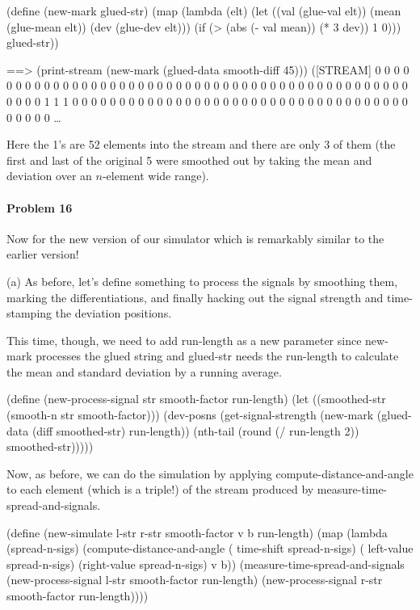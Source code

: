 \mbox{} %

\beginlisp
(define (new-mark glued-str)
  (map (lambda (elt)
         (let ((val  (glue-val  elt))
               (mean (glue-mean elt))
               (dev  (glue-dev  elt)))
           (if (> (abs (- val mean)) (* 3 dev))
               1
               0)))
       glued-str))
\endlisp

\beginlisp
==> (print-stream (new-mark (glued-data smooth-diff 45)))
([STREAM] 0 0 0 0 0 0 0 0 0 0 0 0 0 0 0 0 0 0 0 0 0 0 0 0 0 0 0 0 0 0 0 0 0
          0 0 0 0 0 0 0 0 0 0 0 0 0 0 0 0 0 0 1 1 1 0 0 0 0 0 0 0 0 0 0 0 0
          0 0 0 0 0 0 0 0 0 0 0 0 0 0 0 0 0 0 0 0 0 0 0 0 0 0 0 0 0 \ldots
\endlisp

Here the 1's are 52 elements into the stream and there are only 3 of them (the
first and last of the original 5 were smoothed out by taking the mean and
deviation over an $n$-element wide range).

\paragraph{Problem 16}

Now for the new version of our simulator which is remarkably
similar to the earlier version!

(a) As before, let's define something to process the signals by smoothing them,
marking the differentiations, and finally hacking out the signal strength and
time-stamping the deviation positions.

This time, though, we need to add {\cf run-length} as a new parameter since
{\cf new-mark} processes the glued string and {\cf glued-str} needs the {\cf
run-length} to calculate the mean and standard deviation by a running average.

\beginlisp
(define (new-process-signal str smooth-factor run-length)
  (let ((smoothed-str (smooth-n str smooth-factor)))
    (dev-posns (get-signal-strength (new-mark (glued-data (diff smoothed-str) run-length))
                                    (nth-tail (round (/ run-length 2)) smoothed-str)))))
\endlisp

Now, as before, we can do the simulation by applying {\cf
compute-distance-and-angle} to each element (which is a triple!) of the stream
produced by {\cf measure-time-spread-and-signals}.

\beginlisp
(define (new-simulate l-str r-str smooth-factor v b run-length)
  (map (lambda (spread-n-sigs) (compute-distance-and-angle ( time-shift spread-n-sigs)
                                                           ( left-value spread-n-sigs)
                                                           (right-value spread-n-sigs)
                                                           v b))
       (measure-time-spread-and-signals (new-process-signal l-str smooth-factor run-length)
                                        (new-process-signal r-str smooth-factor run-length))))
\endlisp

